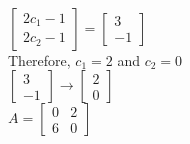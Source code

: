 \begin{solution}
            \\
            $\begin{bmatrix} 2c_1-1 \\ 2c_2-1 \end{bmatrix}= \begin{bmatrix} 3 \\ -1 \end{bmatrix}$
            \\
            Therefore, $c_1 = 2$  and $c_2=0$
            \\
            $\begin{bmatrix} 3 \\ -1 \end{bmatrix}\to\begin{bmatrix} 2 \\ 0 \end{bmatrix}$
            \\
            $A=\begin{bmatrix} 0 & 2 \\ 6 & 0 \end{bmatrix}$
		\end{solution}